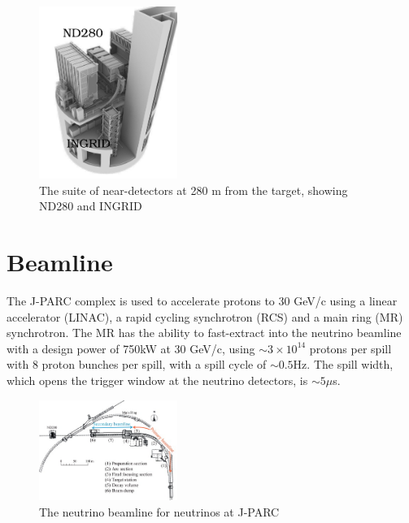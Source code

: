 \begin{figure}[h]
	\includegraphics[width=0.4\textwidth, trim={10mm 0mm 0mm 0mm}, clip,page=1]{figures/det_chap/view/image_nd.jpeg}
	\caption{The suite of near-detectors at 280 m from the target, showing ND280 and INGRID}
\end{figure}

\section{Beamline}
The J-PARC complex\cite{jparc_tdr} is used to accelerate protons to 30 GeV/c using a linear accelerator (LINAC), a rapid cycling synchrotron (RCS) and a main ring (MR) synchrotron. The MR has the ability to fast-extract into the neutrino beamline with a design power of 750kW at 30 GeV/c, using $\sim3\times10^{14}$ protons per spill with 8 proton bunches per spill, with a spill cycle of $\sim0.5$Hz. The spill width, which opens the trigger window at the neutrino detectors, is $\sim5\mu$s\cite{t2k_det}.

\begin{figure}[h]
	\includegraphics[width=0.4\textwidth, trim={0mm 0mm 0mm 0mm}, clip,page=1]{figures/det_chap/beam/beam.jpg}
	\caption{The neutrino beamline for neutrinos at J-PARC}
	\label{fig:neutrino_beamline}
\end{figure}

